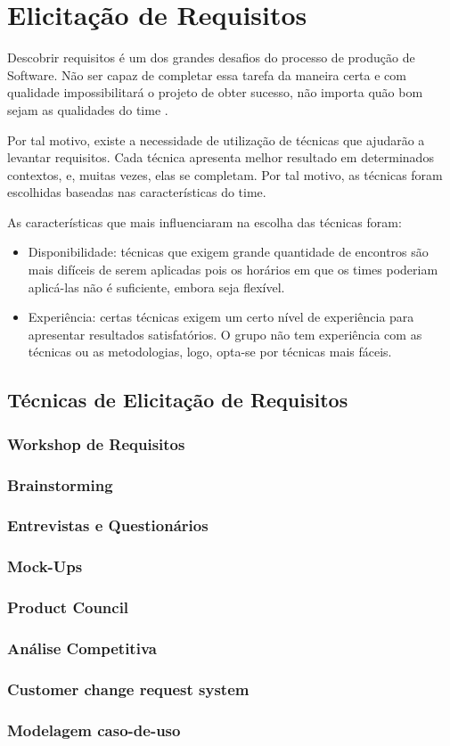 \chapter[Elicitação de Requisitos]{Elicitação de Requisitos}
Descobrir requisitos é um dos grandes desafios do processo de produção de Software. Não ser capaz de completar essa tarefa da maneira certa e com qualidade impossibilitará o projeto de obter sucesso, não importa quão bom sejam as qualidades do time \cite{safe005}.

Por tal motivo, existe a necessidade de utilização de técnicas que ajudarão a levantar requisitos. Cada técnica apresenta melhor resultado em determinados contextos, e, muitas vezes, elas se completam. Por tal motivo, as técnicas foram escolhidas baseadas nas características do time.

As características que mais influenciaram na escolha das técnicas foram:
\begin{itemize}
  \item Disponibilidade: técnicas que exigem grande quantidade de encontros são mais difíceis de serem aplicadas pois os horários em que os times poderiam aplicá-las não é suficiente, embora seja flexível.
  \item Experiência: certas técnicas exigem um certo nível de experiência para apresentar resultados satisfatórios. O grupo não tem experiência com as técnicas ou as metodologias, logo, opta-se por técnicas mais fáceis.
\end{itemize}

\section{Técnicas de Elicitação de Requisitos}
\subsection{Workshop de Requisitos}

\subsection{Brainstorming}

\subsection{Entrevistas e Questionários}

\subsection{Mock-Ups}

\subsection{Product Council}

\subsection{Análise Competitiva}

\subsection{Customer change request system}

\subsection{Modelagem caso-de-uso}
